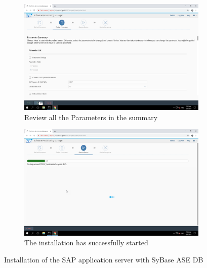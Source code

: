 \begin{figure}[!htb]\ContinuedFloat
    \begin{subfigure}{0.5\textwidth}
        \captionsetup{width=0.8\linewidth}
        \includegraphics[width=0.9\linewidth]{img/Methodologie/SAP01.png}
        \centering
        \caption{Review all the Parameters in the summary}
    \end{subfigure}
    \begin{subfigure}{0.5\textwidth}
        \captionsetup{width=0.8\linewidth}
        \includegraphics[width=0.9\linewidth]{img/Methodologie/SAP00.png} 
        \centering
        \caption{The installation has successfully started}
    \end{subfigure}
    \caption[Installation SAP]{Installation of the SAP application server with SyBase ASE DB}
\end{figure}